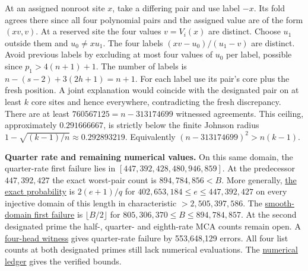\documentclass[11pt,letterpaper]{article}
\begin{document}
At an assigned nonroot site $x$, take a differing pair and use label $-x$. Its fold agrees there since all four polynomial pairs and the assigned value are of the form $(xv,v)$. At a reserved site the four values $v=V_i(x)$ are distinct. Choose $u_1$ outside them and $u_0\ne xu_1$. The four labels $(xv-u_0)/(u_1-v)$ are distinct. Avoid previous labels by excluding at most four values of $u_0$ per label, possible since $p_1>4(n+1)+1$. The number of labels is $n-(s-2)+3(2h+1)=n+1$. For each label use its pair's core plus the fresh position. A joint explanation would coincide with the designated pair on at least $k$ core sites and hence everywhere, contradicting the fresh discrepancy. There are at least $760567125=n-313174699$ witnessed agreements. This ceiling, approximately $0.291666667$, is strictly below the finite Johnson radius $1-\sqrt{(k-1)/n}\approx0.292893219$. Equivalently $(n-313174699)^2>n(k-1)$.


\textbf{Quarter rate and remaining numerical values.} On this same domain, the quarter-rate first failure lies in $[447{,}392{,}428,480{,}946{,}859]$. At the predecessor $447{,}392{,}427$ the exact worst-pair count is $894{,}784{,}856<B$. More generally, \href{https://github.com/SlopDotCash/proximityprize/blob/16ad266b56c7550fe930bf00e94e24a5d3a9cd74/ArkLib/Research/ProximityGap/Frontier/QuarterRateTwoRichFloor.lean}{the exact probability} is $2(e+1)/q$ for $402{,}653{,}184\le e\le447{,}392{,}427$ on every injective domain of this length in characteristic $>2{,}505{,}397{,}586$. The \href{https://github.com/SlopDotCash/proximityprize/blob/16ad266b56c7550fe930bf00e94e24a5d3a9cd74/ArkLib/Research/ProximityGap/Frontier/SmoothQuarterTwoHeadWindow.lean}{smooth-domain first failure} is $\lfloor B/2\rfloor$ for $805{,}306{,}370\le B\le894{,}784{,}857$. At the second designated prime the half-, quarter- and eighth-rate MCA counts remain open. A \href{https://github.com/SlopDotCash/proximityprize/blob/182cb01cb/ArkLib/Research/ProximityGap/Frontier/SecondPrimePlanarQuartet.lean}{four-head witness} gives quarter-rate failure by 553,648,129 errors. All four list counts at both designated primes still lack numerical evaluations. The \href{https://github.com/SlopDotCash/proximityprize/blob/16ad266b56c7550fe930bf00e94e24a5d3a9cd74/docs/research/proximity-gap/integration-assessment-2026-11-21.md}{numerical ledger} gives the verified bounds.

\newpage
\end{document}
